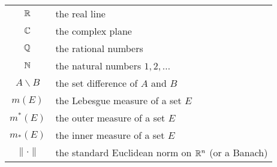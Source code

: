 \begin{tabular}{c|l}
$\mathbb{R}$&the real line\\
$\mathbb{C}$&the complex plane\\
$\mathbb{Q}$&the rational numbers\\
$\mathbb{N}$&the natural numbers $1,2,\dotsc$\\
$A\smallsetminus B$&the set difference of $A$ and $B$\\
$m(E)$&the Lebesgue measure of a set $E$\\
$m^*(E)$&the outer measure of a set $E$\\
$m_*(E)$&the inner measure of a set $E$\\
$\|\cdot\|$&the standard Euclidean norm on $\mathbb{R}^n$ (or a Banach)\\
\end{tabular}

